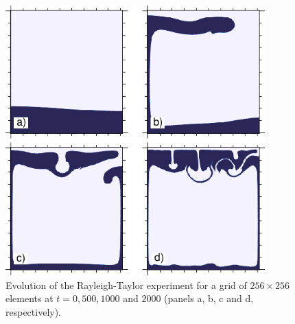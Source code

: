 \begin{figure}[h!]
\centering
\includegraphics[width=10cm]{./Figures/Rayleigh.pdf}
\caption{Evolution of the Rayleigh-Taylor experiment for a grid of $256\times256$ elements at $t=0, 500, 1000$ and $2000$ (panels a, b, c and d, respectively).}
\label{fig:rayleigh}
\end{figure}